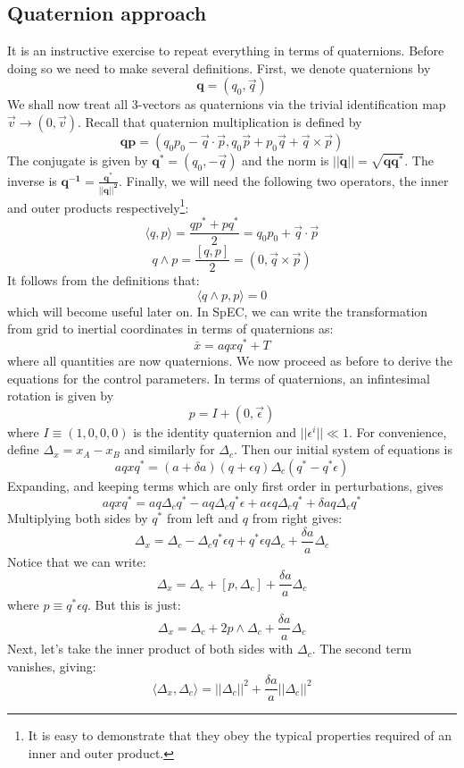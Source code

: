 \documentclass[aps, prd, amsmath, floats, floatfix, twocolumn,superscriptaddress, nofootinbib, showpacs]{revtex4-1}
\theoremstyle{plain}
\theoremstyle{definition}
\newcommand{\w}[1]{\mathbf{#1}}
\begin{document}
\subsection*{Quaternion approach}
It is an instructive exercise to repeat everything in terms of quaternions. Before doing so we need to make several definitions.
First, we denote quaternions by
\[\w{q}=(q_{0},\vec{q}) \]
We shall now treat all 3-vectors as quaternions via the trivial identification map $\vec{v}\rightarrow (0,\vec{v})$. Recall that quaternion multiplication is defined by
\[\w{qp}=(q_{0}p_{0}-\vec{q}\cdot\vec{p},q_{0}\vec{p}+p_{0}\vec{q}+\vec{q}\times\vec{p}) \]
The conjugate is given by $\w{q}^{*}=(q_{0},-\vec{q})$ and the norm is $||\w{q}||=\sqrt{\w{qq}^{*}}$. The inverse is $\w{q^{-1}=\frac{q^{*}}{||q||^{2}}}$. 
Finally, we will need the following two operators, the inner and outer products respectively\footnote{It is easy to demonstrate that they obey the typical properties required of an inner and outer product.}: 
\[\langle q, p \rangle = \frac{qp^{*}+pq^{*}}{2}=q_0p_0+\vec{q}\cdot\vec{p} \]
\[q \wedge p = \frac{[q,p]}{2}=(0,\vec{q}\times\vec{p}) \]
It follows from the definitions that:
\[\langle q\wedge p ,p \rangle = 0 \]
which will become useful later on.
In SpEC, we can write the transformation from grid to inertial coordinates in terms of 
quaternions as:
\[ \bar{x}=aqxq^{*}+T\]
where all quantities are now quaternions. We now proceed as before to derive the equations 
for the control parameters. In terms of quaternions, an infintesimal rotation is given by
\[p=I+(0,\vec{\epsilon})\]
where $I \equiv (1,0,0,0)$ is the identity quaternion and $||\epsilon^{i}||\ll 1$.
For convenience, define $\Delta_{x}=x_{A}-x_{B}$ and similarly for $\Delta_{c}$. Then our initial
system of equations is
\[aqxq^{*}=(a+\delta a)(q+\epsilon q)\Delta_{c}(q^{*}-q^{*}\epsilon)\]
Expanding, and keeping terms which are only first order in perturbations, gives
\[aqxq^{*}=aq\Delta_{c}q^{*}-aq\Delta_{c}q^{*}\epsilon+a\epsilon q \Delta_{c}q^{*}+\delta aq \Delta_{c}q^{*}\]
Multiplying both sides by $q^{*}$ from left and $q$ from right gives:
\[\Delta_{x}=\Delta_{c}-\Delta_{c}q^{*}\epsilon q +q^{*}\epsilon q \Delta_{c}+\frac{\delta a}{a}\Delta_{c} \] 
Notice that we can write:
\[\Delta_{x}=\Delta_{c}+[p,\Delta_{c}]+\frac{\delta a}{a}\Delta_{c}\]
where $p \equiv q^{*}\epsilon q$. But this is just:
\[\Delta_{x}=\Delta_{c}+2p\wedge \Delta_{c} + \frac{\delta a}{a}\Delta_{c}\]
Next, let's take the inner product of both sides with $\Delta_{c}$. The second term vanishes,
giving:
\[\langle \Delta_{x},\Delta_{c}\rangle = ||\Delta_{c}||^{2}+ \frac{\delta a}{a}||\Delta_{c}||^{2}\]
\end{document}
